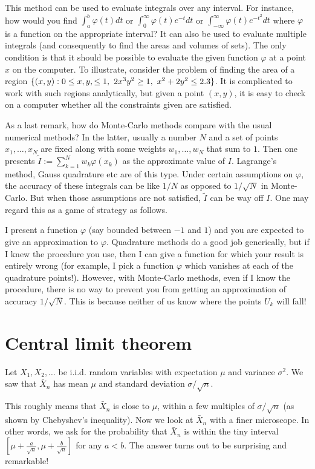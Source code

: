 \documentclass[preprint,  11pt]{amsart}
\def\sig{{\sigma}}
\renewcommand\phi{{\varphi}}
\begin{document}
This method can be used to evaluate integrals over any interval. For instance, how would you find $\int_{a}^{b}\phi(t) dt$ or $\int_{0}^{\infty}\phi(t) e^{-t}dt$ or $\int_{-\infty}^{\infty}\phi(t)e^{-t^{2}}dt$ where  $\phi$ is a function on the appropriate interval? It can also be used to evaluate multiple integrals (and consequently to find the areas and volumes of sets). The only condition is that it should be possible to evaluate the given function $\phi$ at a point $x$ on the computer. To illustrate, consider the problem of finding the area of a region $\{(x,y){\; : \;} 0\le x,y, \le1, \ 2x^{3}y^{2}\ge 1, \ x^{2}+2y^{2}\le 2.3 \}$. It is complicated to work with such regions analytically, but given a point $(x,y)$, it is easy to check on a computer whether all the constraints given are satisfied.

As a last remark, how do Monte-Carlo methods compare with the usual numerical methods? In the latter, usually a number $N$ and a set of points $x_{1},\ldots ,x_{N}$ are fixed along with some weights $w_{1},\ldots ,w_{N}$ that sum to $1$. Then one presents $\tilde{I}:=\sum_{k=1}^{N}w_{k}\phi(x_{k})$ as the approximate value of $I$. Lagrange's method, Gauss quadrature etc are of this type. Under certain assumptions on $\phi$, the accuracy of these integrals can be like $1/N$ as opposed to $1/\sqrt{N}$ in Monte-Carlo. But when those assumptions are not satisfied, $\tilde{I}$ can be way off $I$. One may regard this as a game of strategy as follows.

I present a function $\phi$ (say bounded between $-1$ and $1$)  and you are expected to give an approximation to $\phi$. Quadrature methods do a good job generically, but if I knew the procedure you use, then I can give a function for which your result is entirely wrong (for example, I pick a function $\phi$ which vanishes at each of the quadrature points!). However, with Monte-Carlo methods, even if I know the procedure, there is no way to prevent you from getting an approximation of accuracy $1/\sqrt{N}$. This is because neither of us know where the points $U_{k}$ will fall!


\section{Central limit theorem}
Let $X_{1},X_{2},\ldots$ be i.i.d. random variables with expectation $\mu$ and variance $\sig^{2}$. We saw that $\bar{X}_{n}$ has mean $\mu$ and standard deviation $\sig/\sqrt{n}$.

This roughly means that $\bar{X}_{n}$ is close to $\mu$, within a few multiples of $\sig/\sqrt{n}$ (as shown by Chebyshev's inequality). Now we look at $\bar{X}_{n}$ with a finer microscope. In other words, we ask for the probability that $\bar{X}_{n}$ is within the tiny interval $[\mu+\frac{a}{\sqrt{n}},\mu+\frac{b}{\sqrt{n}}]$ for any $a<b$. The answer turns out to be surprising and remarkable!
\end{document}
